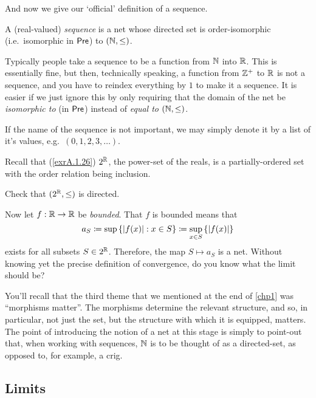 And now we give our `official' definition of a sequence.
\begin{dfn}[Sequence]\label{dfn3.3.4}
A (real-valued) \emph{sequence} is a net whose directed set is order-isomorphic (i.e.~isomorphic in $\mathsf{Pre}$) to $(\mathbb{N} ,\leq )$.
\begin{rmk}
Typically people take a sequence to be a function from $\mathbb{N}$ into $\mathbb{R}$.  This is essentially fine, but then, technically speaking, a function from $\mathbb{Z} ^+$ to $\mathbb{R}$ is not a sequence, and you have to reindex everything by $1$ to make it a sequence.  It is easier if we just ignore this by only requiring that the domain of the net be \emph{isomorphic to} (in $\mathsf{Pre}$) instead of \emph{equal to} $(\mathbb{N} ,\leq )$.
\end{rmk}
\begin{rmk}
If the name of the sequence is not important, we may simply denote it by a list of it's values, e.g.~$(0,1,2,3,\ldots )$.
\end{rmk}
\end{dfn}
\begin{exm}
Recall that (\cref{exrA.1.26}) $2^{\mathbb{R}}$, the power-set of the reals, is a partially-ordered set with the order relation being inclusion.
\begin{exr}
Check that $(2^{\mathbb{R}},\leq )$ is directed.
\end{exr}
Now let $f:\mathbb{R} \rightarrow \mathbb{R}$ be \emph{bounded}.  That $f$ is bounded means that
\begin{equation}
a_S\coloneqq \sup \left\{ \lvert f(x)\rvert:x\in S\right\} \coloneqq \sup _{x\in S}\left\{ \lvert f(x)\rvert\right\}
\end{equation}
exists for all subsets $S\in 2^{\mathbb{R}}$.  Therefore, the map $S\mapsto a_S$ is a net.  Without knowing yet the precise definition of convergence, do you know what the limit should be?
\end{exm}

You'll recall that the third theme that we mentioned at the end of \cref{chp1}  was ``morphisms matter''.  The morphisms determine the relevant structure, and so, in particular, not just the set, but the structure with which it is equipped, matters.  The point of introducing the notion of a net at this stage is simply to point-out that, when working with sequences, $\mathbb{N}$ is to be thought of as a directed-set, as opposed to, for example, a crig.

\subsection{Limits}

